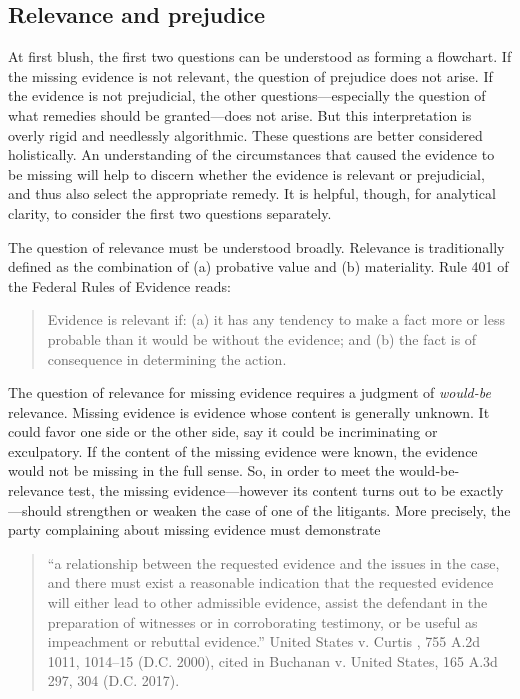 \documentclass[
  10pt,
  dvipsnames,enabledeprecatedfontcommands]{scrartcl}
\begin{document}
\hypertarget{relevance-and-prejudice}{%
\subsection{Relevance and prejudice}\label{relevance-and-prejudice}}

At first blush, the first two questions can be understood as forming a
flowchart. If the missing evidence is not relevant, the question of
prejudice does not arise. If the evidence is not prejudicial, the other
questions---especially the question of what remedies should be
granted---does not arise. But this interpretation is overly rigid and
needlessly algorithmic. These questions are better considered
holistically. An understanding of the circumstances that caused the
evidence to be missing will help to discern whether the evidence is
relevant or prejudicial, and thus also select the appropriate remedy. It
is helpful, though, for analytical clarity, to consider the first two
questions separately.

The question of relevance must be understood broadly. Relevance is
traditionally defined as the combination of (a) probative value and (b)
materiality. Rule 401 of the Federal Rules of Evidence reads:

\begin{quote}
Evidence is relevant if: (a) it has any tendency to make a fact more or less probable than it would be without the evidence; and (b) the fact is of consequence in determining the action.
\end{quote}

\noindent The question of relevance for missing evidence requires a
judgment of \textit{would-be} relevance. Missing evidence is evidence
whose content is generally unknown. It could favor one side or the other
side, say it could be incriminating or exculpatory. If the content of
the missing evidence were known, the evidence would not be missing in
the full sense. So, in order to meet the would-be-relevance test, the
missing evidence---however its content turns out to be exactly---should
strengthen or weaken the case of one of the litigants. More precisely,
the party complaining about missing evidence must demonstrate

\begin{quote}
``a relationship between the requested evidence and the issues in the
case, and there must exist a reasonable indication that the requested
evidence will either lead to other admissible evidence, assist the
defendant in the preparation of witnesses or in corroborating testimony,
or be useful as impeachment or rebuttal evidence.'' United States v.
Curtis , 755 A.2d 1011, 1014--15 (D.C. 2000), cited in Buchanan v.
United States, 165 A.3d 297, 304 (D.C. 2017).
\end{quote}
\end{document}
